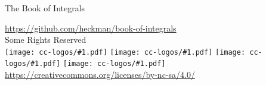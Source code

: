 \pagestyle{empty}
\newcommand\cclogo[1]{%
\texttt{[image: cc-logos/\#1.pdf]}%
}
\null\vfill
\begin{center}
The Book of Integrals\\
\begin{footnotesize}
\url{https://github.com/heckman/book-of-integrals}\\[1ex]%
Some Rights Reserved\\[1ex]%
\cclogo{cc} \cclogo{by} \cclogo{nc} \cclogo{sa}\\[-0.5ex]%
\url{https://creativecommons.org/licenses/by-nc-sa/4.0/}
\end{footnotesize}
\end{center}
